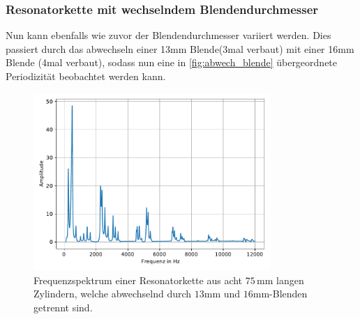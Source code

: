\subsubsection{Resonatorkette mit wechselndem Blendendurchmesser}
Nun kann ebenfalls wie zuvor der Blendendurchmesser variiert werden. Dies passiert durch das abwechseln einer 13mm Blende(3mal verbaut) mit einer 16mm Blende (4mal verbaut), sodass 
nun eine in \autoref{fig:abwech_blende} übergeordnete Periodizität beobachtet werden kann.

\begin{figure}
    \center
    \includegraphics[width=0.8\textwidth]{pic/13u16.pdf}
    \caption{Frequenzspektrum einer Resonatorkette aus acht $75\,$mm langen Zylindern, welche abwechselnd durch $13$mm und $16$mm-Blenden getrennt sind.}
    \label{fig:abwech_blende}
\end{figure}
